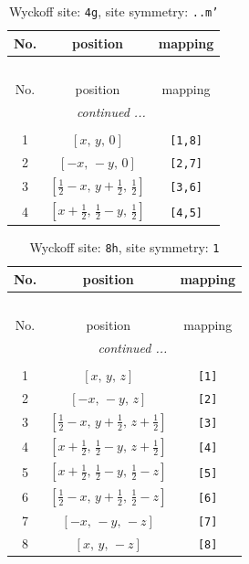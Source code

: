 \documentclass[fleqn,8pt]{jsarticle}
\begin{document}
\renewcommand{\arraystretch}{1.2}
\begin{longtable}{ccc}
\caption{Wyckoff site: {\tt 4g}, site symmetry: {\tt ..m'}}
 \\
 \hline \hline
No. & position & mapping \\ \hline \endfirsthead

\multicolumn{2}{l}{\tablename\ \thetable{}} \\
 \hline \hline
No. & position & mapping \\ \hline \endhead

 \hline \hline
\multicolumn{2}{r}{\footnotesize\it continued ...} \\ \endfoot

 \hline \hline
\multicolumn{2}{r}{} \\ \endlastfoot

1 & $\left[ x,\, y,\, 0 \right]$ & {\tt [1,8]} \\ \hline
2 & $\left[ - x,\, - y,\, 0 \right]$ & {\tt [2,7]} \\ \hline
3 & $\left[ \frac{1}{2} - x,\, y + \frac{1}{2},\, \frac{1}{2} \right]$ & {\tt [3,6]} \\ \hline
4 & $\left[ x + \frac{1}{2},\, \frac{1}{2} - y,\, \frac{1}{2} \right]$ & {\tt [4,5]} \\
\end{longtable}
\renewcommand{\arraystretch}{1.2}
\begin{longtable}{ccc}
\caption{Wyckoff site: {\tt 8h}, site symmetry: {\tt 1}}
 \\
 \hline \hline
No. & position & mapping \\ \hline \endfirsthead

\multicolumn{2}{l}{\tablename\ \thetable{}} \\
 \hline \hline
No. & position & mapping \\ \hline \endhead

 \hline \hline
\multicolumn{2}{r}{\footnotesize\it continued ...} \\ \endfoot

 \hline \hline
\multicolumn{2}{r}{} \\ \endlastfoot

1 & $\left[ x,\, y,\, z \right]$ & {\tt [1]} \\ \hline
2 & $\left[ - x,\, - y,\, z \right]$ & {\tt [2]} \\ \hline
3 & $\left[ \frac{1}{2} - x,\, y + \frac{1}{2},\, z + \frac{1}{2} \right]$ & {\tt [3]} \\ \hline
4 & $\left[ x + \frac{1}{2},\, \frac{1}{2} - y,\, z + \frac{1}{2} \right]$ & {\tt [4]} \\ \hline
5 & $\left[ x + \frac{1}{2},\, \frac{1}{2} - y,\, \frac{1}{2} - z \right]$ & {\tt [5]} \\ \hline
6 & $\left[ \frac{1}{2} - x,\, y + \frac{1}{2},\, \frac{1}{2} - z \right]$ & {\tt [6]} \\ \hline
7 & $\left[ - x,\, - y,\, - z \right]$ & {\tt [7]} \\ \hline
8 & $\left[ x,\, y,\, - z \right]$ & {\tt [8]} \\
\end{longtable}
\end{document}
